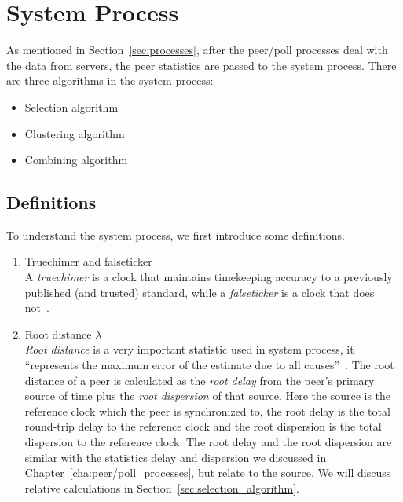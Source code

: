 

\chapter{System Process}
\label{cha:system_process}

As mentioned in Section~\ref{sec:processes}, after the peer/poll processes deal
with the data from servers, the peer statistics are passed to the system
process.  There are three algorithms in the system process:
\begin{itemize}
    \item Selection algorithm
    \item Clustering algorithm
    \item Combining algorithm
\end{itemize}

\section{Definitions}%
\label{sec:system_concepts}
To understand the system process, we first introduce some definitions.

\begin{enumerate}
    \item Truechimer and falseticker\\
        A \emph{truechimer} is a clock that maintains timekeeping accuracy to a
        previously published (and trusted) standard, while a \emph{falseticker}
        is a clock that does not~\cite{redbook}.
    \item Root distance $\lambda$\\
        \emph{Root distance} is a very important statistic used in system
        process, it ``represents the maximum error of the estimate due to all
        causes''~\cite{performance_metrics}. The root distance of a peer is
        calculated as the \emph{root delay} from the peer's primary source of
        time plus the \emph{root dispersion} of that source. Here the source is
        the reference clock which the peer is synchronized to, the root delay
        is the total round-trip delay to the reference clock and the root
        dispersion is the total dispersion to the reference clock. The root
        delay and the root dispersion are similar with the statistics delay and
        dispersion we discussed in Chapter~\ref{cha:peer/poll_processes}, but
        relate to the source. We will discuss relative calculations in
        Section~\ref{sec:selection_algorithm}.
\end{enumerate}

